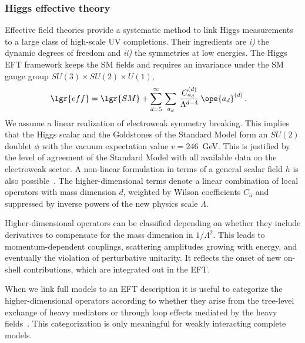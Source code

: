 \subsubsection*{Higgs effective theory}
\label{sec:validity_theory_eff}

Effective field theories provide a systematic method to link Higgs
measurements to a large class of high-scale UV completions. Their
ingredients are \textit{i)} the dynamic degrees of freedom and
\textit{ii)} the symmetries at low energies.  The Higgs EFT framework
keeps the SM fields and requires an invariance under the SM gauge
group $SU(3) \times SU(2) \times U(1)$,
%
\begin{align} \lgr{eff} &= \lgr{SM} + \sum_{d=5}^\infty \, \sum_{a_d}
\, \dfrac{C_{a_d}^{(d)}}{\Lambda^{d-4}}\,\ope{a_d}^{(d)} \,.
 \label{eq:efflaggen}
\end{align}
%
We assume a linear realization of electroweak symmetry breaking.  This
implies that the Higgs scalar and the Goldstones of the Standard Model
form an $SU(2)$ doublet $\phi$ with the vacuum expectation value
$v=246$~GeV. This is justified by the level of agreement of the
Standard Model with all available data on the electroweak sector. A
non-linear formulation in terms of a general scalar field $h$ is also
possible~\cite{nonlin}.  The higher-dimensional terms denote a linear
combination of local operators with mass dimension $d$, weighted by
Wilson coefficients $C_a$ and suppressed by inverse powers of the new
physics scale $\Lambda$.

Higher-dimensional operators can be classified depending on whether
they include derivatives to compensate for the mass dimension in
$1/\Lambda^2$. This leads to momentum-dependent couplings, scattering
amplitudes growing with energy, and eventually the violation of
perturbative unitarity. It reflects the onset of new on-shell
contributions, which are integrated out in the EFT.

When we link full models to an EFT description it is useful to
categorize the higher-dimensional operators according to whether they
arise from the tree-level exchange of heavy mediators or through loop
effects mediated by the heavy
fields~\cite{Passarino:2012cb,Arzt:1994gp}. This categorization is
only meaningful for weakly interacting complete models.\medskip

